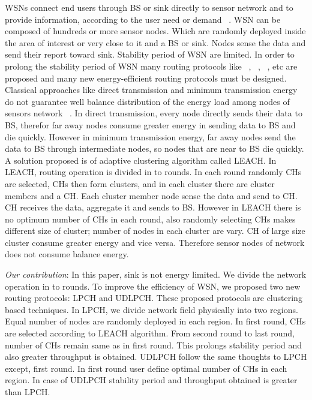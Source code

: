 \documentclass[journal]{IEEEtran}
\begin{document}
WSNs connect end users through BS or sink directly to sensor network and to provide information, according to the user need or demand ~\cite{R1}. WSN can be composed of hundreds or more sensor nodes. Which are randomly deployed inside the area of interest or very close to it and a BS or sink. Nodes sense the data and send their report toward sink. Stability period of WSN are limited. In order to prolong the stability period of WSN many routing protocols like ~\cite{R2}, ~\cite{R3}, ~\cite{R4}, etc are proposed and many new energy-efficient routing protocols must be designed. Classical approaches like direct transmission and minimum transmission energy do not guarantee well balance distribution of the energy load among nodes of sensors network ~\cite{R5}. In direct transmission, every node directly sends their data to BS, therefor far away nodes consume greater energy in sending data to BS and die quickly. However in minimum transmission energy, far away nodes send the data to BS through intermediate nodes, so nodes that are near to BS die quickly. A solution proposed is of adaptive clustering algorithm called LEACH. In LEACH, routing operation is divided in to rounds. In each round randomly CHs are selected, CHs then form clusters, and in each cluster there are cluster members and a CH. Each cluster member node sense the data and send to CH. CH receives the data, aggregate it and sends to BS. However in LEACH there is no optimum number of CHs in each round, also randomly selecting CHs makes different size of cluster; number of nodes in each cluster are vary. CH of large size cluster consume greater energy and vice versa. Therefore sensor nodes of network does not consume balance energy.

\textit{Our contribution}: In this paper, sink is not energy limited. We divide the network operation in to rounds. To improve the efficiency of WSN, we proposed two new routing protocols: LPCH and UDLPCH. These proposed protocols are clustering based techniques. In LPCH, we divide network field physically into two regions. Equal number of nodes are randomly deployed in each region. In first round, CHs are selected according to LEACH algorithm. From second round to last round, number of CHs remain same as in first round. This prolongs stability period and also greater throughput is obtained. UDLPCH follow the same thoughts to LPCH except, first round. In first round user define optimal number of CHs in each region. In case of UDLPCH stability period and throughput obtained is greater than LPCH.
\end{document}
